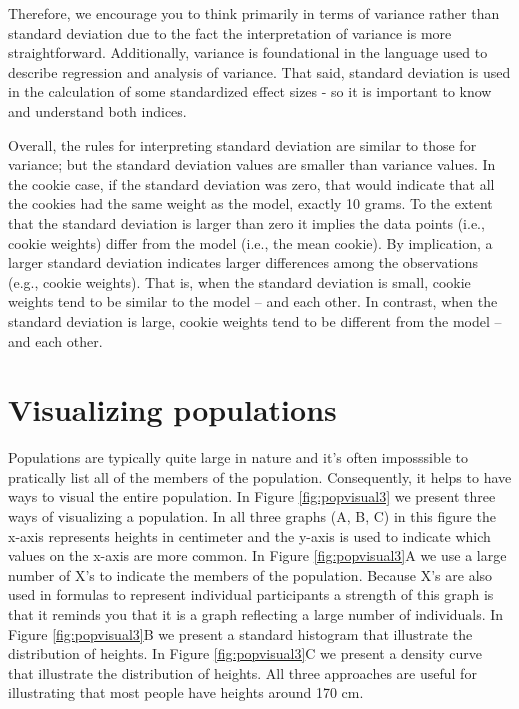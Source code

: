 \documentclass[
]{krantz}
\begin{document}
Therefore, we encourage you to think primarily in terms of variance rather than standard deviation due to the fact the interpretation of variance is more straightforward. Additionally, variance is foundational in the language used to describe regression and analysis of variance. That said, standard deviation is used in the calculation of some standardized effect sizes - so it is important to know and understand both indices.

Overall, the rules for interpreting standard deviation are similar to those for variance; but the standard deviation values are smaller than variance values. In the cookie case, if the standard deviation was zero, that would indicate that all the cookies had the same weight as the model, exactly 10 grams. To the extent that the standard deviation is larger than zero it implies the data points (i.e., cookie weights) differ from the model (i.e., the mean cookie). By implication, a larger standard deviation indicates larger differences among the observations (e.g., cookie weights). That is, when the standard deviation is small, cookie weights tend to be similar to the model -- and each other. In contrast, when the standard deviation is large, cookie weights tend to be different from the model -- and each other.

\hypertarget{visualizing-populations}{%
\section{Visualizing populations}\label{visualizing-populations}}

Populations are typically quite large in nature and it's often imposssible to pratically list all of the members of the population. Consequently, it helps to have ways to visual the entire population. In Figure \ref{fig:popvisual3} we present three ways of visualizing a population. In all three graphs (A, B, C) in this figure the x-axis represents heights in centimeter and the y-axis is used to indicate which values on the x-axis are more common. In Figure \ref{fig:popvisual3}A we use a large number of X's to indicate the members of the population. Because X's are also used in formulas to represent individual participants a strength of this graph is that it reminds you that it is a graph reflecting a large number of individuals. In Figure \ref{fig:popvisual3}B we present a standard histogram that illustrate the distribution of heights. In Figure \ref{fig:popvisual3}C we present a density curve that illustrate the distribution of heights. All three approaches are useful for illustrating that most people have heights around 170 cm.
\end{document}
